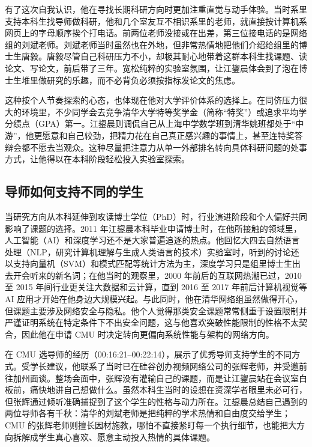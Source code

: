 \documentclass[UTF8,a4paper,11pt,fontset=fandol]{ctexart}
\begin{document}
有了这次自我认识，他在寻找长期科研方向时更加注重直觉与动手体验。当时系里支持本科生找导师做科研，他和几个室友互不相识系里的老师，就直接按计算机系网页上的字母顺序挨个打电话。前两位老师没接或在出差，第三位接电话的是网络组的刘斌老师。刘斌老师当时虽然也在外地，但非常热情地把他们介绍给组里的博士生唐毅。唐毅尽管自己科研压力不小，却极其耐心地带着这群本科生找课题、读论文、写论文，前后带了三年。宽松纯粹的实验室氛围，让江鋆晨体会到了泡在博士生堆里做研究的乐趣，而不必背负必须按指标发论文的焦虑。

这种按个人节奏探索的心态，也体现在他对大学评价体系的选择上。在同侪压力很大的环境里，不少同学会去竞争清华大学特等奖学金（简称“特奖”）或追求平均学分绩点（GPA）第一。江鋆晨则调侃自己从上海中学数学班到清华姚班都处于“中游”，他更愿意和自己较劲，把精力花在自己真正感兴趣的事情上，甚至连特奖答辩会都不愿去当观众。这种尽量把注意力从单一外部排名转向具体科研问题的处事方式，让他得以在本科阶段轻松投入实验室探索。

\subsection{导师如何支持不同的学生}
当研究方向从本科延伸到攻读博士学位（PhD）时，行业演进阶段和个人偏好共同影响了课题的选择。2011 年江鋆晨本科毕业申请博士时，在他所接触的领域里，人工智能（AI）和深度学习还不是大家普遍追逐的热点。他回忆大四去自然语言处理（NLP，研究计算机理解与生成人类语言的技术）实验室时，听到的讨论还以支持向量机（SVM）和模式匹配等统计方法为主，深度学习只是组里博士生出去开会听来的新名词；在他当时的观察里，2000 年前后的互联网热潮已过，2010 至 2015 年间行业更关注大数据和云计算，直到 2016 至 2017 年前后计算机视觉等 AI 应用才开始在他身边大规模兴起。与此同时，他在清华网络组虽然做得开心，但课题主要涉及网络安全与隐私。他个人觉得那类安全课题常常侧重于设置限制并严谨证明系统在特定条件下不出安全问题，这与他喜欢突破性能限制的性格不太契合，因此他在申请 CMU 时决定转向更偏向系统性能与架构的网络方向。

在 CMU 选导师的经历（00:16:21–00:22:14），展示了优秀导师支持学生的不同方式。受学长建议，他联系了当时已在硅谷创办视频网络公司的张辉老师，并受邀前往加州面谈。整场会面中，张辉没有灌输自己的课题，而是让江鋆晨站在会议室白板前，痛快地讲自己想做什么。虽然本科生当时的设想在资深学者眼里未必可行，但张辉通过倾听准确捕捉到了这个学生的性格与动力所在。江鋆晨总结自己遇到的两位导师各有千秋：清华的刘斌老师是把纯粹的学术热情和自由度交给学生；CMU 的张辉老师则擅长因材施教，哪怕不直接紧盯每一个执行细节，也能把大方向拆解成学生真心喜欢、愿意主动投入热情的具体课题。
\end{document}
